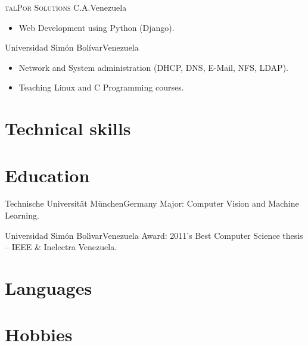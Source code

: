\documentclass[10pt]{moderncv}
\begin{document}
{\textsc{talPor Solutions C.A.}}{Venezuela}{}{%
\begin{itemize}
  \item Web Development using Python (Django).
\end{itemize}
}

 {Universidad Sim\'{o}n Bol\'{i}var}{Venezuela}{}{%
\begin{itemize}
  \item Network and System administration (DHCP, DNS, E-Mail, NFS, LDAP).
  \item Teaching Linux and C Programming courses.
\end{itemize}
}

\section{Technical skills}



\section{Education}

  {Technische Universit\"at M\"unchen}{Germany}{}{%
    Major: Computer Vision and Machine Learning.
  }

  {Universidad Sim\'on Bol\'{\i}var}{Venezuela}{}{%
    Award: 2011's Best Computer Science thesis -- IEEE \& Inelectra Venezuela.
  }


\section{Languages}


\section{Hobbies}
\end{document}
